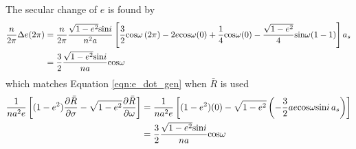 \documentclass[]{aiaa-tc}%
\begin{document}
The secular change of $e$ is found by
	\begin{equation} 
\begin{aligned}
\frac{n}{2\pi}\Delta e(2\pi)&=\frac{n}{2\pi}\frac{\sqrt{1-e^2}\textup{sin}i}{n^2a} \left [ \frac{3}{2}\textup{cos}\omega \,(2\pi)-2e\textup{cos}\omega (0) +\frac{1}{4} \textup{cos}\omega (0)  - \frac{\sqrt{1-e^2}}{4}\textup{sin}\omega(1-1 )\right ]a_s \\
 &=\frac{3}{2}\frac{\sqrt{1-e^2}\textup{sin}i}{na}\textup{cos}\omega
 \end{aligned}
	\end{equation}
which matches Equation \ref{eqn:e_dot_gen} when $\bar{R}$ is used
	\begin{equation} 
\begin{aligned} 
\frac{1}{na^2e}\left [ (1-e^2)\frac{\partial \bar{R}}{\partial \sigma} -\sqrt{1-e^2}\frac{\partial \bar{R}}{\partial \omega} \right ] &= \frac{1}{na^2e}\left [ (1-e^2)(0) -\sqrt{1-e^2}\left (-\frac{3}{2}ae\textup{cos} \omega \textup{sin}i\,   a_s  \right ) \right ]\\
 &=\frac{3}{2}\frac{\sqrt{1-e^2}\textup{sin}i}{na}\textup{cos}\omega
\end{aligned}
	\end{equation}
\end{document}
